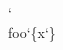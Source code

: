 \documentclass{article}
\begin{document}
{\ttfamily\global\expandafter\let\expandafter\myttf\the\font}
{\myttf \char`\\foo\char`\{x\char`\}}
\end{document}
